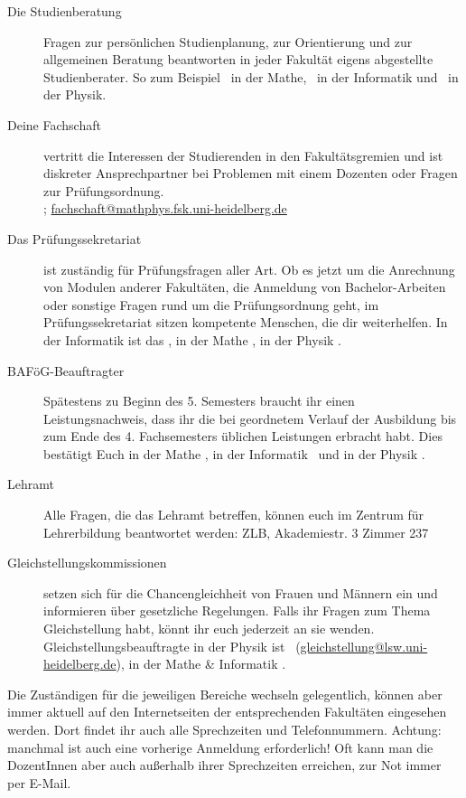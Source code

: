 \begin{description}
\item[Die Studienberatung] Fragen zur persönlichen Studienplanung, zur
	Orientierung und zur allgemeinen Beratung beantworten in jeder Fakultät
	eigens abgestellte Studienberater. So zum Beispiel \studienberatungmathe\
	in der Mathe, \studienberatunginformatik\ in der Informatik und
	\studienberatungphysik\ in der Physik.

\item[Deine Fachschaft] vertritt die Interessen der Studierenden in den
	Fakultätsgremien und ist diskreter Ansprechpartner bei Problemen mit einem
	Dozenten oder Fragen zur Prüfungsordnung. \\\fsraum;
	\url{fachschaft@mathphys.fsk.uni-heidelberg.de}

\item[Das Prüfungssekretariat] ist zuständig für Prüfungsfragen aller Art. Ob
	es jetzt um die Anrechnung von Modulen anderer Fakultäten, die Anmeldung
	von Bachelor-Arbeiten oder sonstige Fragen rund um die Prüfungsordnung
	geht, im Prüfungssekretariat sitzen kompetente Menschen, die dir
	weiterhelfen. In der Informatik ist das \pruefsekinfo, in der Mathe
	\pruefsekmathe, in der Physik \pruefsekphysik.

\item[BAFöG-Beauftragter] Spätestens zu Beginn des 5. Semesters braucht ihr
	einen Leistungsnachweis, dass ihr die bei geordnetem Verlauf der Ausbildung
	bis zum Ende des 4. Fachsemesters üblichen Leistungen erbracht habt. Dies
	bestätigt Euch in der Mathe \bafogmathe , in der Informatik
	\bafoginformatik\ und in der Physik \bafogphysik .

\item[Lehramt] Alle Fragen, die das Lehramt betreffen, können euch im Zentrum
	für Lehrerbildung beantwortet werden: ZLB, Akademiestr. 3 Zimmer 237

\item[Gleichstellungskommissionen] setzen sich für die Chancengleichheit von
	Frauen und Männern ein und informieren über gesetzliche Regelungen. Falls
	ihr Fragen zum Thema Gleichstellung habt, könnt ihr euch jederzeit an sie
	wenden. Gleichstellungsbeauftragte in der Physik ist
	\frauenbeauftragtephysik\ (\url{gleichstellung@lsw.uni-heidelberg.de}), in
	der Mathe \& Informatik \frauenbeauftragtemathe .


\end{description}


\noindent Die Zuständigen für die jeweiligen Bereiche wechseln gelegentlich, können aber immer
aktuell auf den Internetseiten der entsprechenden Fakultäten eingesehen werden. Dort
findet ihr auch alle Sprechzeiten und Telefonnummern. Achtung: manchmal ist auch
eine vorherige Anmeldung erforderlich! Oft kann man die DozentInnen aber auch
außerhalb ihrer Sprechzeiten erreichen, zur Not immer per E-Mail.\\[.9cm]

